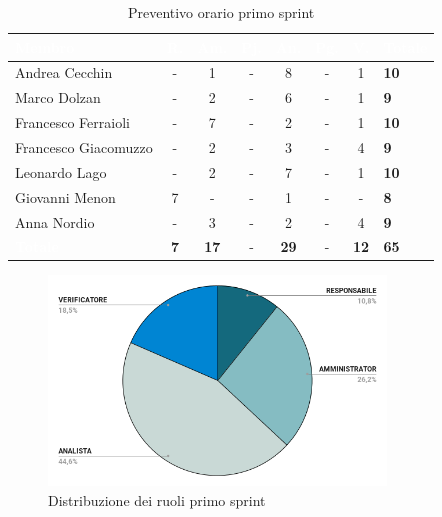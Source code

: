 {
\setlength{\tabcolsep}{10pt}
\renewcommand{\arraystretch}{1.5}
\begin{table}[h!]
    \centering
    \begin{tabularx}{\textwidth}{| l | c | c | c | c | c | c | X |}
        \hline
        \rowcolor{headerrow} \textbf{\textcolor{white}{Membro}} & \textbf{\textcolor{white}{R.}} & \textbf{\textcolor{white}{Am.}} & \textbf{\textcolor{white}{Pj.}} & \textbf{\textcolor{white}{An.}} & \textbf{\textcolor{white}{Pg.}} & \textbf{\textcolor{white}{V.}} & \textbf{\textcolor{white}{Totale}} \\
        \hline
        Andrea Cecchin & - & 1 & - & 8 & - & 1 & \textbf{10} \\
        \hline
        Marco Dolzan & - & 2 & - & 6 & - & 1 & \textbf{9} \\
        \hline
        Francesco Ferraioli & - & 7 & - & 2 & - & 1 & \textbf{10} \\
        \hline  
        Francesco Giacomuzzo & - & 2 & - & 3 & - & 4 & \textbf{9} \\
        \hline
        Leonardo Lago & - & 2 & - & 7 & - & 1 & \textbf{10} \\
        \hline
        Giovanni Menon & 7 & - & - & 1 & - & - & \textbf{8} \\
        \hline
        Anna Nordio & - & 3 & - & 2 & - & 4 & \textbf{9} \\
        \hline
    \cellcolor{headerrow} \textbf{\textcolor{white}{Totale}} & \textbf{7} & \textbf{17} & - & \textbf{29} & - & \textbf{12} & \textbf{65} \\
        \hline
    \end{tabularx} 
    \caption{Preventivo orario primo sprint}
    \label{tab:preventivoorarioprimosprint}
\end{table}
}

\begin{figure}[h!]
    \centering
    \includegraphics[width=0.8\textwidth]{prev1ruoli.png}
    \caption{Distribuzione dei ruoli primo sprint}
    \label{fig:preventivoorarioprimosprint}
\end{figure}


